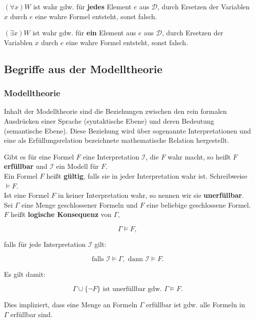 \documentclass[runningheads,deutsch]{llncs}
\begin{document}
$(\forall x) W$ ist wahr gdw. für \textbf{jedes} Element $e$ aus $\mathcal{D}$, durch Ersetzen der Variablen $x$ durch $e$ eine wahre Formel entsteht, sonst falsch.

$(\exists x) W$ ist wahr gdw. für \textbf{ein} Element aus $e$ aus $\mathcal{D}$, durch Ersetzen der Variablen $x$ durch $e$ eine wahre Formel entsteht, sonst falsch.

\subsection{Begriffe aus der Modelltheorie}

\subsubsection{Modelltheorie}
Inhalt der Modelltheorie sind die Beziehungen zwischen den rein formalen Ausdrücken einer Sprache (syntaktische Ebene) und deren Bedeutung (semantische Ebene). Diese Beziehung wird über sogenannte Interpretationen und eine als Erfüllungsrelation bezeichnete mathematische Relation hergestellt.

Gibt es für eine Formel $F$ eine Interpretation $\mathcal{I}$, die $F$ wahr macht, so heißt $F$ \textbf{erfüllbar} und $\mathcal I$ ein Modell für $F$. \\

Ein Formel $F$ heißt \textbf{gültig}, falls sie in jeder Interpretation wahr ist. Schreibweise $\vDash F$. \\

Ist eine Formel $F$ in keiner Interpretation wahr, so nennen wir sie \textbf{unerfüllbar}. \\

Sei $\Gamma$ eine Menge geschlossener Formeln und $F$ eine beliebige geschlossene Formel. $F$ heißt \textbf{logische Konsequenz} von $\Gamma$,

\[
    \Gamma \vDash F,
\]

\parindent0mm
falls für jede Interpretation $\mathcal I$ gilt:

\[
    \text{falls } \mathcal I \vDash \Gamma, \text{ dann } \mathcal I \vDash F.
\]

Es gilt damit:

\[
    \Gamma \cup \{\lnot F\} \text{ ist unerfüllbar gdw. } \Gamma \vDash F.
\]

\parindent5mm

Dies impliziert, dass eine Menge an Formeln $\Gamma$ erfüllbar ist gdw. alle Formeln in $\Gamma$ erfüllbar sind.
\end{document}
